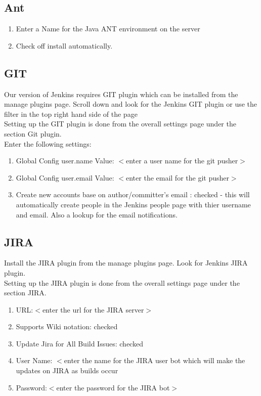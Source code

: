 \subsection {Ant}
\begin{enumerate}
\item Enter a Name for the Java ANT environment on the server
\item Check off install automatically.
\end{enumerate}

\subsection{GIT}
Our version of Jenkins requires GIT plugin which can be installed from the manage plugins page.
Scroll down and look for the Jenkins GIT plugin  or use the filter in the top right hand side of the page\\

Setting up the GIT plugin is done from the overall settings page under the section Git plugin.\\

Enter the following settings:
\begin{enumerate}
\item Global Config user.name Value: $<$enter a user name for the git pusher$>$
\item Global Config user.email Value: $<$enter the email for the git pusher$>$
\item Create new accounts base on author/committer's email : checked - this will automatically create people in the Jenkins people page with thier username and email. Also a lookup for the email notifications.
\end{enumerate}
\subsection{JIRA}

Install the JIRA plugin from the manage plugins page. Look for Jenkins JIRA plugin.\\
Setting up the JIRA plugin is done from the overall settings page under the section JIRA.\\
\begin{enumerate}
\item URL:$<$enter the url for the JIRA server$>$
\item Supports Wiki notation: checked
\item Update Jira for All Build Issues: checked
\item User Name: $<$enter the name for the JIRA user bot which will make the updates on JIRA as builds occur
\item Password:$<$enter the password for the JIRA bot$>$
\end{enumerate}


